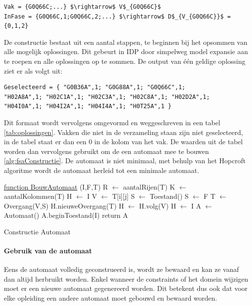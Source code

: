 \begin{lstlisting}[mathescape, caption=IDP Syntax conversion, frame=single]
Vak = {G0Q66C;...} $\rightarrow$ V$_{G0Q66C}$
InFase = {G0Q66C,1;G0Q66C,2;...} $\rightarrow$ D$_{V_{G0Q66C}}$ = {0,1,2}
\end{lstlisting}

De constructie bestaat uit een aantal stappen, te beginnen bij het opsommen van alle mogelijk oplossingen. Dit gebeurt in IDP door simpelweg model expansie aan te roepen en alle oplossingen op te sommen. De output van \'{e}\'{e}n geldige oplossing ziet er als volgt uit:
\begin{lstlisting}[mathescape, caption=IDP model, frame=single]
Geselecteerd = { "G0B36A",1; "G0G88A",1; "G0Q66C",1; 
"H02A8A",1; "H02C1A",1; "H02C3A",1; "H02C8A",1; "H02D2A",1;
"H04I0A",1; "H04I2A",1; "H04I4A",1; "H0T25A",1 }
\end{lstlisting}
Dit formaat wordt vervolgens omgevormd en weggeschreven in een tabel \ref{tab:oplossingen}. Vakken die niet in de verzameling staan zijn niet geselecteerd, in de tabel staat er dan een 0 in de kolom van het vak. De waarden uit de tabel worden dan vervolgens gebruikt om de een automaat mee te bouwen \ref{alg:fsaConstructie}. De automaat is niet minimaal, met behulp van het Hopcroft algoritme wordt de automaat herleid tot een minimale automaat. 

\begin{algorithm}
	\underline{function BouwAutomaat} (I,F,T)\;
	R $\leftarrow$ aantalRijen(T) \;
	K $\leftarrow$ aantalKolommen(T) \;
	H $\leftarrow$ I \;
		{
			{
			V $\leftarrow$ T[i][j] \;
				{
					{
					S $\leftarrow$ Toestand() \;
					}
					{
					S $\leftarrow$ F \;
					}
				T $\leftarrow$ Overgang(V,S) \;
				H.nieuweOvergang(T) \;
				}
			H $\leftarrow$ H.volg(V) \;
			}
		H $\leftarrow$ I \;
		}
	A $\leftarrow$ Automaat() \;
	A.beginToestand(I) \;
	return A \;
	\caption{Constructie Automaat\label{alg:fsaConstructie}}
\end{algorithm}

\paragraph{Gebruik van de automaat}
Eens de automaat volledig geconstrueerd is, wordt ze bewaard en kan ze vanaf dan altijd herbruikt worden. Enkel wanneer de constraints of het domein wijzigen moet er een nieuwe automaat gegenereerd worden. Dit betekent dus ook dat voor elke opleiding een andere automaat moet gebouwd en bewaard worden. 

